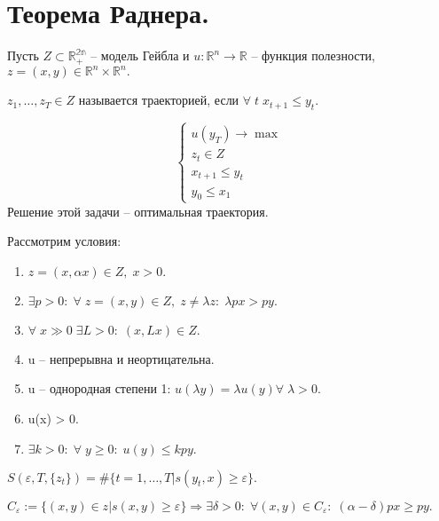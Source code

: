 \chapter{Теорема Раднера.}\label{cha:18}

Пусть $Z \subset \mathbb{R^{2n}_+}$ -- модель Гейбла и $u: \mathbb{R}^n \to \mathbb{R}$ -- функция полезности, $z = (x, y) \in \mathbb{R}^n \times \mathbb{R}^n.$

$z_1, \ldots, z_T \in Z$ называется траекторией, если $\forall \; t \; x_{t + 1} \leq y_t.$

\begin{problem}
	$$\begin{cases}
		u(y_T) \to \max\\
		z_t \in Z\\
		x_{t + 1} \leq y_t\\
		y_0 \leq x_1
	\end{cases}$$ Решение этой задачи -- оптимальная траектория. 
\end{problem}

Рассмотрим условия:

\begin{enumerate}
	\item $ z = (x, \alpha x) \in Z, \; x > 0.$
	\item $\exists p > 0: \; \forall \; z = (x, y) \in Z, \; z \neq \lambda z: \; \lambda p x > py.$
	\item $\forall \; x \gg 0 \; \exists L > 0: \; (x, Lx) \in Z.$
	\item u -- непрерывна и неортицательна.
	\item u -- однородная степени 1: $u(\lambda y) = \lambda u(y) \forall \; \lambda > 0.$
	\item u(x) > 0.
	\item $\exists k > 0: \; \forall \; y \geq 0: \; u(y) \leq kpy.$
\end{enumerate}

\begin{sign}
	$S(\varepsilon, T, \{ z_t \}) = \#\{ t = 1, \ldots, T | s(y_t, x) \geq \varepsilon \}.$
\end{sign}

\begin{lemma}
	$C_{\varepsilon} := \{ (x, y) \in z | s(x, y) \geq \varepsilon \} \Rightarrow \exists \delta > 0: \; \forall (x,y) \in C_{\varepsilon}: \; (\alpha - \delta)px \geq py.$
\end{lemma}

